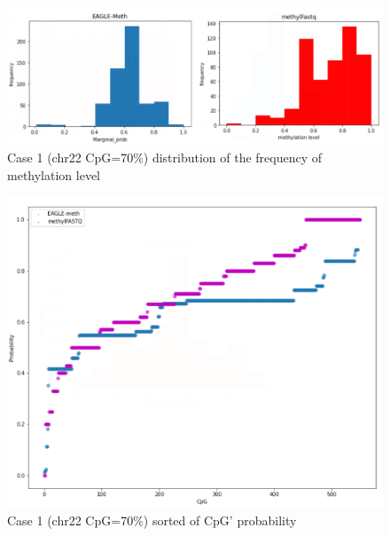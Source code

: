 \documentclass{PHlab-thesis}
\begin{document}
\begin{figure}[h!]
  \centering
  \includegraphics[scale=0.8]{figures/CHR22_70.PNG}
  \caption{Case 1 (chr22 CpG=70\%) distribution of the frequency of methylation level}
  \label{fig:case_1_1} 
\end{figure}
\begin{figure}[h!]
  \centering
  \includegraphics[scale=0.8]{figures/CHR22_70_2.PNG}
  \caption{Case 1 (chr22 CpG=70\%) sorted of CpG' probability}
  \label{fig:case_1_2} 
\end{figure}
\end{document}
